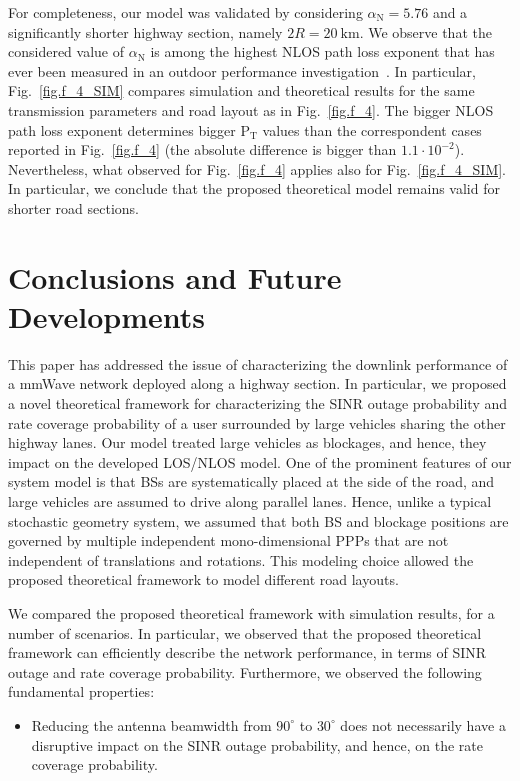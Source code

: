 \documentclass[10pt,journal,a4paper]{IEEEtran}
\begin{document}
{For completeness, our model was validated by considering $\alpha_\mathrm{N} = 5.76$ and a significantly shorter highway section, namely $2R = \SI{20}{\kilo\meter}$.
{We observe that the considered value of $\alpha_\mathrm{N}$ is among the highest NLOS path loss exponent that has ever been measured in an outdoor performance investigation~\cite{6932503}.}
In particular, Fig.~\ref{fig.f_4_SIM} compares simulation and theoretical results for the same transmission parameters and road layout as in Fig.~\ref{fig.f_4}.
The bigger NLOS path loss exponent determines bigger $\mathrm{P}_{\mathrm{T}}$ values than the correspondent cases reported in Fig.~\ref{fig.f_4} (the absolute difference is bigger than $1.1 \cdot 10^{-2}$). Nevertheless, what observed for Fig.~\ref{fig.f_4} applies also for Fig.~\ref{fig.f_4_SIM}. In particular, we conclude that the proposed theoretical model remains valid for shorter road sections.}

\vspace{-5mm}\section{Conclusions and Future Developments}\label{sec.cl}
This paper has addressed the issue of characterizing the downlink performance of a mmWave network deployed along a highway section. In particular, we proposed a novel theoretical framework for characterizing the SINR outage probability and rate coverage probability of a user surrounded by large vehicles sharing the other highway lanes. Our model treated large vehicles as blockages, and hence, they impact on the developed LOS/NLOS model. One of the prominent features of our system model is that BSs are systematically placed at the side of the road, and large vehicles are assumed to drive along parallel lanes. Hence, unlike a typical stochastic geometry system, we assumed that both BS and blockage positions are governed by multiple independent mono-dimensional PPPs that are not independent of translations and rotations. This modeling choice allowed the proposed theoretical framework to model different road layouts.

We compared the proposed theoretical framework with simulation results, for a number of scenarios. In particular, we observed that the proposed theoretical framework can efficiently describe the network performance, in terms of SINR outage and rate coverage probability. Furthermore, we observed the following fundamental properties:
\begin{itemize}
\item Reducing the antenna beamwidth from $90^\circ$ to $30^\circ$ does not necessarily have a disruptive impact on the SINR outage probability, and hence, on the rate coverage probability.
\vspace{-3mm}{\item In contrast with bi-dimensional mmWave cellular networks, the network performance is not largely impacted by values of BS density ranging from moderately sparse to dense deployments.
\item Overall, for a fixed SINR threshold, a reduced SINR outage probability can be achieved for moderately sparse network deployments.}
\end{itemize}
\end{document}
